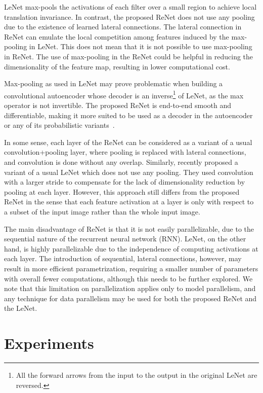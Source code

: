 LeNet max-pools the activations of each filter over a small region to achieve
local translation invariance. In contrast, the proposed ReNet does not use any
pooling due to the existence of learned lateral connections. The lateral
connection in ReNet can emulate the local competition among features induced by
the max-pooling in LeNet.  This does not mean that it is not possible to use
max-pooling in ReNet. The use of max-pooling in the ReNet could be helpful in
reducing the dimensionality of the feature map, resulting in lower computational
cost.

Max-pooling as used in LeNet may prove problematic when building a
convolutional autoencoder whose decoder is an inverse\footnote{
    All the forward arrows from the input to the output in the original LeNet
    are reversed.
}
of LeNet, as the max operator is not invertible. The proposed
ReNet is end-to-end smooth and differentiable, making it more suited to be used
as a decoder in the autoencoder or any of its probabilistic variants~\citep[see,
e.g.,][]{Kingma+Welling-ICLR2014}.

In some sense, each layer of the ReNet can be considered as a variant of a usual
convolution+pooling layer, where pooling is replaced with lateral connections,
and convolution is done without any overlap. Similarly, \citet{Springenberg2014}
recently proposed a variant of a usual LeNet which does not use any pooling.
They used convolution with a larger stride to compensate for the lack of
dimensionality reduction by pooling at each layer. However, this approach still
differs from the proposed ReNet in the sense that each feature activation at a
layer is only with respect to a subset of the input image rather than the whole
input image.

The main disadvantage of ReNet is that it is not easily parallelizable, due to
the sequential nature of the recurrent neural network (RNN). LeNet, on the other
hand, is highly parallelizable due to the independence of computing activations
at each layer. The introduction of sequential, lateral connections, however, may
result in more efficient parametrization, requiring a smaller number of
parameters with overall fewer computations, although this needs to be further
explored. We note that this limitation on parallelization applies only to
model parallelism, and any technique for data parallelism may be used for both
the proposed ReNet and the LeNet.

\section{Experiments}\label{sec:renet_results}

